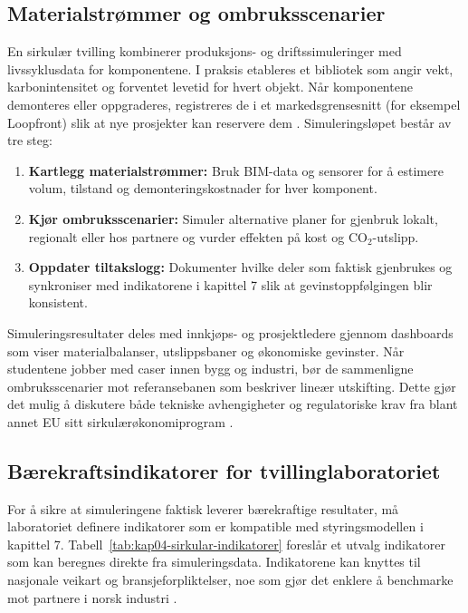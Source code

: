\subsection{Materialstrømmer og ombruksscenarier}
En sirkulær tvilling kombinerer produksjons- og driftssimuleringer med livssyklusdata for komponentene. I praksis etableres et bibliotek som angir vekt, karbonintensitet og forventet levetid for hvert objekt. Når komponentene demonteres eller oppgraderes, registreres de i et markedsgrensesnitt (for eksempel Loopfront) slik at nye prosjekter kan reservere dem \citep{statsbygg2023loopfront}. Simuleringsløpet består av tre steg:
\begin{enumerate}
    \item \textbf{Kartlegg materialstrømmer:} Bruk BIM-data og sensorer for å estimere volum, tilstand og demonteringskostnader for hver komponent.
    \item \textbf{Kjør ombruksscenarier:} Simuler alternative planer for gjenbruk lokalt, regionalt eller hos partnere og vurder effekten på kost og CO$_2$-utslipp.
    \item \textbf{Oppdater tiltakslogg:} Dokumenter hvilke deler som faktisk gjenbrukes og synkroniser med indikatorene i kapittel 7 slik at gevinstoppfølgingen blir konsistent.
\end{enumerate}

Simuleringsresultater deles med innkjøps- og prosjektledere gjennom dashboards som viser materialbalanser, utslippsbaner og økonomiske gevinster. Når studentene jobber med caser innen bygg og industri, bør de sammenligne ombruksscenarier mot referansebanen som beskriver lineær utskifting. Dette gjør det mulig å diskutere både tekniske avhengigheter og regulatoriske krav fra blant annet EU sitt sirkulærøkonomiprogram \citep{miljodir2022sirkular,regjeringen2021sirkulaer}.

\subsection{Bærekraftsindikatorer for tvillinglaboratoriet}
For å sikre at simuleringene faktisk leverer bærekraftige resultater, må laboratoriet definere indikatorer som er kompatible med styringsmodellen i kapittel 7. Tabell~\ref{tab:kap04-sirkular-indikatorer} foreslår et utvalg indikatorer som kan beregnes direkte fra simuleringsdata. Indikatorene kan knyttes til nasjonale veikart og bransjeforpliktelser, noe som gjør det enklere å benchmarke mot partnere i norsk industri \citep{norskindustri2023sirkular}.

